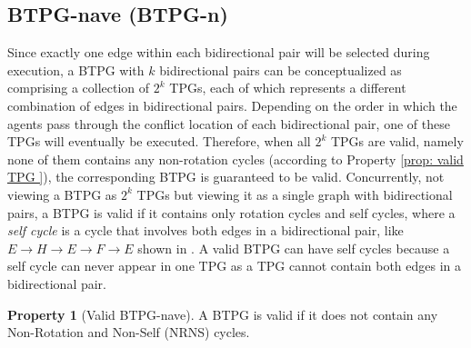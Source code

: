 \documentclass[letterpaper]{article} %
\theoremstyle{definition}
\newtheorem{property}{Property}
\begin{document}
\subsection{BTPG-nave (BTPG-n)}
Since exactly one edge within each bidirectional pair will be selected during execution, a BTPG with $k$ bidirectional pairs can be conceptualized as comprising a collection of $2^k$ TPGs, each of which represents a different combination of edges in bidirectional pairs. Depending on the order in which the agents pass through the conflict location of each bidirectional pair, one of these TPGs will eventually be executed. Therefore, when all $2^k$ TPGs are valid, namely none of them contains any non-rotation cycles (according to Property \ref{prop: valid TPG }), the corresponding BTPG is guaranteed to be valid. Concurrently, not viewing a BTPG as $2^k$ TPGs but viewing it as a single graph with bidirectional pairs, a BTPG is valid if it contains only rotation cycles and self cycles, where a \emph{self cycle} is a cycle that involves both edges in a bidirectional pair, like $E\rightarrow H \rightarrow E \rightarrow F \rightarrow E$ shown in . A valid BTPG can have self cycles because a self cycle can never appear in one TPG as a TPG cannot contain both edges in a bidirectional pair.

\begin{property}[Valid BTPG-nave]
\label{prop: valid BTPG - naive}
A BTPG is valid if it does not contain any Non-Rotation and Non-Self (NRNS) cycles.
\end{property}
\end{document}
